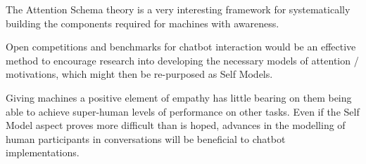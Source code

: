 \documentclass[citeauthoryear]{llncs}
\begin{document}
The Attention Schema theory is a very interesting framework for 
systematically building the components required for machines with awareness.

Open competitions and benchmarks for chatbot interaction would be 
an effective method to encourage research into developing the necessary 
models of attention / motivations, which might then be re-purposed as Self Models.

Giving machines a positive element of empathy has little bearing on 
them being able to achieve super-human levels of performance on other tasks.
%
Even if the Self Model aspect proves more difficult than is hoped, 
advances in the modelling of human participants in conversations will
be beneficial to chatbot implementations.  




%
%
\end{document}
